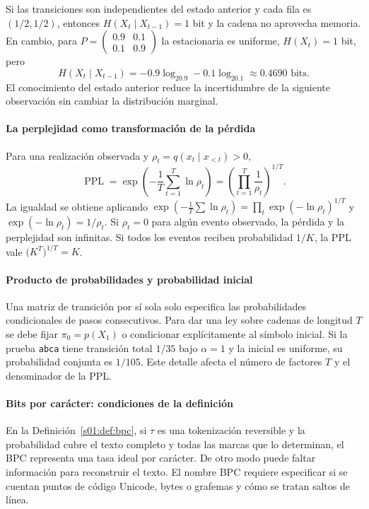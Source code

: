 \begin{ejemplo}
Si las transiciones son independientes del estado anterior y cada fila
es $(1/2,1/2)$, entonces $H(X_t\mid X_{t-1})=1$ bit y la cadena
no aprovecha memoria. En cambio, para
$P=\left(\begin{smallmatrix}0.9&0.1\\0.1&0.9\end{smallmatrix}\right)$
la estacionaria es uniforme, $H(X_t)=1$ bit, pero
\[
H(X_t\mid X_{t-1})=-0.9\log_20.9-0.1\log_20.1\approx0.4690
\text{ bits}.
\]
El conocimiento del estado anterior reduce la incertidumbre de
la siguiente observación sin cambiar la distribución marginal.
\end{ejemplo}

\paragraph{La perplejidad como transformación de la pérdida}
Para una realización observada y $\rho_t=q(x_t\mid x_{<t})>0$,
\[
\operatorname{PPL}=\exp\left(-\frac1T\sum_{t=1}^T\ln \rho_t\right)
=\left(\prod_{t=1}^T\frac1{\rho_t}\right)^{1/T}.
\]
La igualdad se obtiene aplicando $\exp(-\frac1T\sum\ln\rho_t)=\prod_t\exp(-\ln\rho_t)^{1/T}$
y $\exp(-\ln\rho_t)=1/\rho_t$. Si $\rho_t=0$
para algún evento observado, la pérdida y la perplejidad son infinitas.
Si todos los eventos reciben probabilidad $1/K$, la PPL vale
$\bigl(K^T\bigr)^{1/T}=K$.

\paragraph{Producto de probabilidades y probabilidad inicial}
Una matriz de transición por sí sola solo especifica las probabilidades
condicionales de pasos consecutivos. Para dar una ley sobre cadenas de
longitud $T$ se debe fijar $\pi_0=p(X_1)$ o condicionar explícitamente al símbolo
inicial. Si la prueba \texttt{abca} tiene transición total $1/35$ bajo
$\alpha=1$ y la inicial es uniforme, su probabilidad conjunta es $1/105$.
Este detalle afecta el número de factores $T$ y el denominador de la PPL.

\paragraph{Bits por carácter: condiciones de la definición}
En la Definición~\ref{s01:def:bpc}, si $\tau$ es una tokenización reversible y la
probabilidad cubre el texto completo y todas las marcas que lo determinan, el BPC
representa una tasa ideal por carácter. De otro modo puede faltar información para
reconstruir el texto. El nombre BPC requiere especificar si se cuentan
puntos de código Unicode, bytes o grafemas y cómo se tratan saltos de línea.

